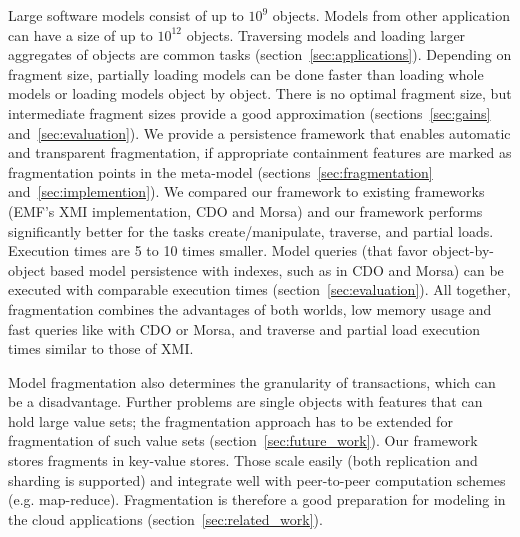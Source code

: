 Large software models consist of up to $10^9$ objects. Models from other application can have a size of up to $10^{12}$ objects. Traversing models and loading larger aggregates of objects are common tasks (section~\ref{sec:applications}). Depending on fragment size, partially loading models can be done faster than loading whole models or loading models object by object. There is no optimal fragment size, but intermediate fragment sizes provide a good approximation  (sections~\ref{sec:gains} and~\ref{sec:evaluation}). We provide a persistence framework that enables automatic and transparent fragmentation, if appropriate containment features are marked as fragmentation points in the meta-model (sections~\ref{sec:fragmentation} and~\ref{sec:implemention}). We compared our framework to existing frameworks (EMF's XMI implementation, CDO and Morsa) and our framework performs significantly better for the tasks create/manipulate, traverse, and partial loads. Execution times are 5 to 10 times smaller. Model queries (that favor object-by-object based model persistence with indexes, such as in CDO and Morsa) can be executed with comparable execution times (section~\ref{sec:evaluation}). All together, fragmentation combines the advantages of both worlds, low memory usage and fast queries like with CDO or Morsa, and traverse and partial load execution times similar to those of XMI.   

Model fragmentation also determines the granularity of transactions, which can be a disadvantage. Further problems are single objects with features that can hold large value sets; the fragmentation approach has to be extended for fragmentation of such value sets (section~\ref{sec:future_work}). Our framework stores fragments in key-value stores. Those scale easily (both replication and sharding is supported) and integrate well with peer-to-peer computation schemes (e.g. map-reduce). Fragmentation is therefore a good preparation for modeling in the cloud applications (section~\ref{sec:related_work}). 